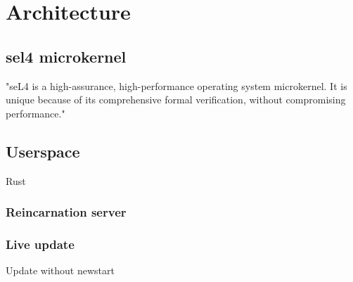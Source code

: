 \section{Architecture}

\subsection{sel4 microkernel}
"seL4 is a high-assurance, high-performance operating system microkernel. It is unique because of its comprehensive formal verification, without compromising performance." \cite{seL4:2024}

\subsection{Userspace}

Rust


\subsubsection{Reincarnation server}

\subsubsection{Live update}
Update without newstart
